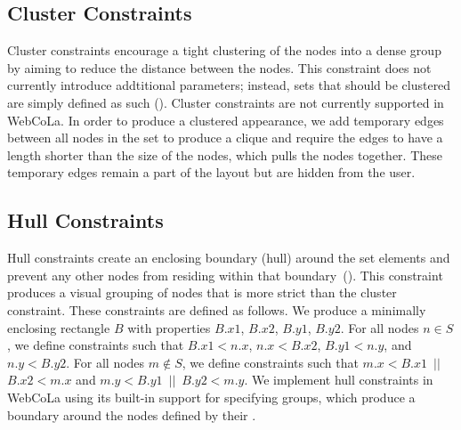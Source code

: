 \vspace{-5px}
\subsection{Cluster Constraints}
Cluster constraints encourage a tight clustering of the nodes into a dense group by
aiming to reduce the distance between the nodes. This constraint does not
currently introduce addtitional parameters; instead, sets that should be
clustered are simply defined as such ().
Cluster constraints are not currently supported in WebCoLa. In order to
produce a clustered appearance, we add temporary edges between all nodes
in the set to produce a clique and require the edges to have a length shorter
than the size of the nodes, which pulls the nodes together. These temporary edges
remain a part of the layout but are hidden from the user.

\vspace{-5px}
\subsection{Hull Constraints}
Hull constraints create an enclosing boundary (hull) around the set elements and 
prevent any other nodes from residing within that 
boundary~(). 
This constraint produces a visual grouping of nodes that is more strict than the cluster constraint.
These constraints are defined as follows. We produce a minimally enclosing rectangle 
$B$ with properties $B.x1$, $B.x2$, $B.y1$, $B.y2$. For all nodes
$n \in S$, we define constraints such that $B.x1 < n.x$, \mbox{$n.x < B.x2$},
$B.y1 < n.y$, and $n.y < B.y2$. For all nodes $m \notin S$, we define
constraints such that \mbox{$m.x < B.x1$ $||$ $B.x2 < m.x$} and \mbox{$m.y < B.y1$ $||$ $B.y2 < m.y$}.
We implement hull constraints in WebCoLa using its built-in support for 
specifying groups, which produce a boundary around 
the nodes defined by their .


